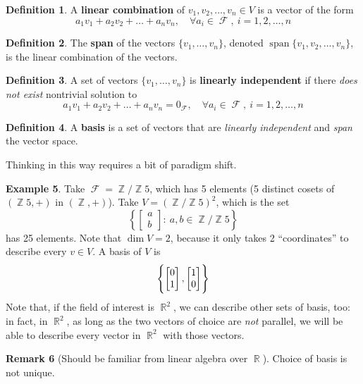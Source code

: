 \documentclass[11pt]{amsart} %
\theoremstyle{definition}
\newtheorem{definition}{Definition}[section]
\newtheorem{example}[definition]{Example}
\theoremstyle{definition}
\newtheorem{remark}[definition]{Remark}
\DeclareMathOperator{\R}{\mathbb{R}}
\DeclareMathOperator{\Z}{\mathbb{Z}}
\DeclareMathOperator{\FF}{\mathcal{F}}
\DeclareMathOperator{\Span}{span}
\numberwithin{equation}{section}
\newcommand{\condset}[4]{\left\{ #1  : \: #2 #3 #4 \right\}}
\begin{document}
\begin{definition}
	A \textbf{linear combination} of $v_1,v_2,\dots,v_n \in V$ is a vector of the form
	$$ a_1 v_1  +a_2 v_2 + \dots + a_n v_n, \quad \forall a_i \in \FF, \: i=1,2,\dots,n $$
\end{definition}

\begin{definition}
	The \textbf{span} of the vectors $\{v_1,\dots, v_n\}$, denoted $\Span \{v_1,v_2,\dots, v_n \}$, is the linear combination of the vectors.
\end{definition}

\begin{definition}
	A set of vectors $\{v_1,\dots, v_n\}$ is \textbf{linearly independent} if there \textit{does not exist} nontrivial solution to
		$$ a_1 v_1  +a_2 v_2 + \dots + a_n v_n = 0_{\FF}, \quad \forall a_i \in \FF, \: i=1,2,\dots,n $$
\end{definition}

\begin{definition}
	A \textbf{basis} is a set of vectors that are \textit{linearly independent} and \textit{span} the vector space.
\end{definition}

Thinking in this way requires a bit of paradigm shift.

\begin{example}
	Take $\FF = \Z / \Z5$, which has 5 elements (5 distinct cosets of $(\Z 5, +)$ in $(\Z,+)$). Take $V=(\Z/\Z5 )^2$, which is the set
	$$ \condset{ \begin{bmatrix} a \\ b \end{bmatrix}}{  a,b}{ \in}{ \Z/\Z5 } $$
	has 25 elements. Note that $\dim V = 2$, because it only takes 2 ``coordinates'' to describe every $v \in V$. A basis of $V$ is
	$$ \set{\begin{bmatrix} 0 \\ 1 \end{bmatrix}, \begin{bmatrix} 1 \\ 0 \end{bmatrix}} $$
	Note that, if the field of interest is $\R^2$, we can describe other sets of basis, too: in fact, in $\R^2$, as long as the two vectors of choice are \textit{not} parallel, we will be able to describe every vector in $\R^2$ with those vectors.
\end{example}

\begin{remark}[Should be familiar from linear algebra over $\R$]
	Choice of basis is not unique.
\end{remark}
\end{document}
